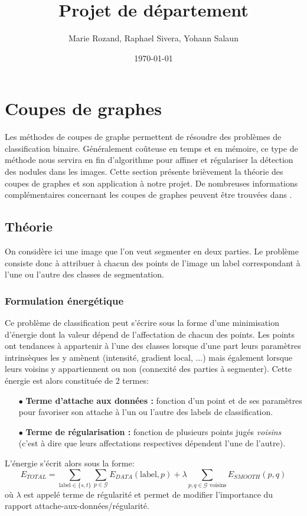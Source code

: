 \documentclass{article}
\title{Projet de département}
\author{Marie Rozand, Raphael Sivera, Yohann Salaun}
\date{\today}
\newcommand{\lab}{\text{label}}
\begin{document}
\maketitle

\section{Coupes de graphes}

Les méthodes de coupes de graphe permettent de résoudre des problèmes de classification binaire. Généralement coûteuse en temps et en mémoire, ce type de méthode nous servira en fin d'algorithme pour affiner et régulariser la détection des nodules dans les images. Cette section présente brièvement la théorie des coupes de graphes et son application à notre projet. De nombreuses informations complémentaires concernant les coupes de graphes peuvent être trouvées dans \cite{bib:GC04, bib:GC05}.		

\subsection{Théorie}

On considère ici une image que l'on veut segmenter en deux parties. Le problème consiste donc à attribuer à chacun des points de l'image un label correspondant à l'une ou l'autre des classes de segmentation.

\subsubsection{Formulation énergétique}

Ce problème de classification peut s'écrire sous la forme d'une minimisation d'énergie dont la valeur dépend de l'affectation de chacun des points. Les points ont tendances à appartenir à l'une des classes lorsque d'une part leurs paramètres intrinsèques les y amènent (intensité, gradient local, ...) mais également lorsque leurs voisins y appartiennent ou non (connexité des parties à segmenter). Cette énergie est alors constituée de 2 termes:
\begin{itemize}
	\item[$\bullet$]\textbf{Terme d'attache aux données :} fonction d'un point et de ses paramètres pour favoriser son attache à l'un ou l'autre des labels de classification.
	\item[$\bullet$]\textbf{Terme de régularisation :} fonction de plusieurs points jugés \textit{voisins} (c'est à dire que leurs affectations respectives dépendent l'une de l'autre).
\end{itemize}
L'énergie s'écrit alors sous la forme:
\[
	E_{TOTAL} = \sum_{\lab \in \{s,t\}} \sum_{p \in \mathcal{G}} E_{DATA}(\lab, p) + \lambda \sum _{p,q \in \mathcal{G} \text{ voisins}} E_{SMOOTH}(p,q)
\]
où $\lambda$ est appelé terme de régularité et permet de modifier l'importance du rapport attache-aux-données/régularité.\\
\end{document}
